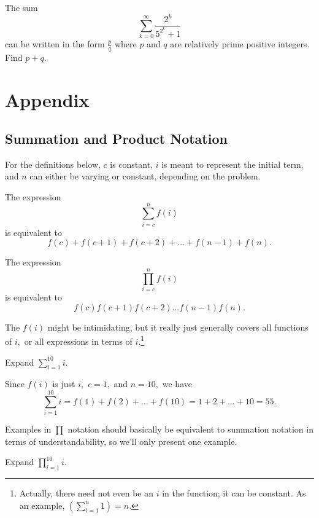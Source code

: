 \documentclass{article}
\begin{document}
\begin{prob}{13}
The sum
\[\sum_{k=0}^{\infty} \frac{2^{k}}{5^{2^{k}}+1}\]can be written in the form $\frac{p}{q}$ where $p$ and $q$ are relatively prime positive integers. Find $p+q$.
\end{prob}

\pagebreak

\section{Appendix}

\subsection{Summation and Product Notation}

For the definitions below, $c$ is constant, $i$ is meant to represent the initial term, and $n$ can either be varying or constant, depending on the problem.

\begin{defi}
The expression $$\sum\limits_{i=c}^n f(i)$$ is equivalent to $$f(c)+f(c+1)+f(c+2)+\dots+f(n-1)+f(n).$$
\end{defi}

\begin{defi}
The expression $$\prod\limits_{i=c}^n f(i)$$ is equivalent to $$f(c)f(c+1)f(c+2)\dots f(n-1)f(n).$$
\end{defi}

The $f(i)$ might be intimidating, but it really just generally covers all functions of $i,$ or all expressions in terms of $i.$\footnote{Actually, there need not even be an $i$ in the function; it can be constant. As an example, $\left(\sum\limits_{i=1}^n 1\right)=n.$}

\begin{exam}
Expand $\sum\limits_{i=1}^{10} i.$
\end{exam}

\begin{sol}
Since $f(i)$ is just $i,$ $c=1,$ and $n=10,$ we have $$\sum\limits_{i=1}^{10}i=f(1)+f(2)+\dots+f(10)=1+2+\dots+10=55.$$
\end{sol}

Examples in $\prod\limits$ notation should basically be equivalent to summation notation in terms of understandability, so we'll only present one example.

\begin{exam}
Expand $\prod\limits_{i=1}^{10} i.$
\end{exam}
\end{document}

